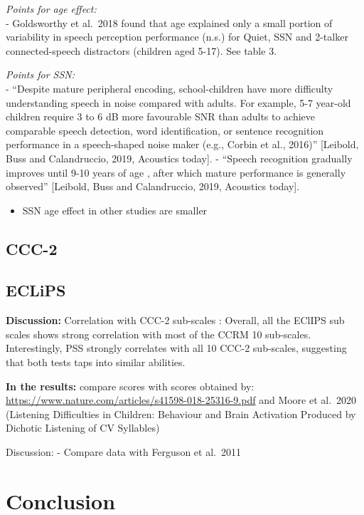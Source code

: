 \documentclass[a4paper, twoside]{templates/ociamthesis}
\providecommand{\tightlist}{%
  \setlength{\itemsep}{0pt}\setlength{\parskip}{0pt}}
\begin{document}
\emph{Points for age effect:}\\
- Goldsworthy et al.~2018 found that age explained only a small portion of variability in speech perception performance (n.s.) for Quiet, SSN and 2-talker connected-speech distractors (children aged 5-17). See table 3.

\emph{Points for SSN:}\\
- ``Despite mature peripheral encoding, school-children have more difficulty understanding speech in noise compared with adults. For example, 5-7 year-old children require 3 to 6 dB more favourable SNR than adults to achieve comparable speech detection, word identification, or sentence recognition performance in a speech-shaped noise maker (e.g., Corbin et al., 2016)'' {[}Leibold, Buss and Calandruccio, 2019, Acoustics today{]}. - ``Speech recognition gradually improves until 9-10 years of age , after which mature performance is generally observed'' {[}Leibold, Buss and Calandruccio, 2019, Acoustics today{]}.

\begin{itemize}
\tightlist
\item
  SSN age effect in other studies are smaller
\end{itemize}

\hypertarget{ccc-2-1}{%
\subsection{CCC-2}\label{ccc-2-1}}

\hypertarget{eclips-1}{%
\subsection{ECLiPS}\label{eclips-1}}

\textbf{Discussion:} Correlation with CCC-2 sub-scales \autocite{Barry2014}: Overall, all the EClIPS sub scales shows strong correlation with most of the CCRM 10 sub-scales. Interestingly, PSS strongly correlates with all 10 CCC-2 sub-scales, suggesting that both tests taps into similar abilities.

\textbf{In the results:} compare scores with scores obtained by: \url{https://www.nature.com/articles/s41598-018-25316-9.pdf} and Moore et al.~2020 (Listening Difficulties in Children: Behaviour and Brain Activation Produced by Dichotic Listening of CV Syllables)

Discussion: - Compare data with Ferguson et al.~2011

\hypertarget{conclusion-2}{%
\section{Conclusion}\label{conclusion-2}}
\end{document}
